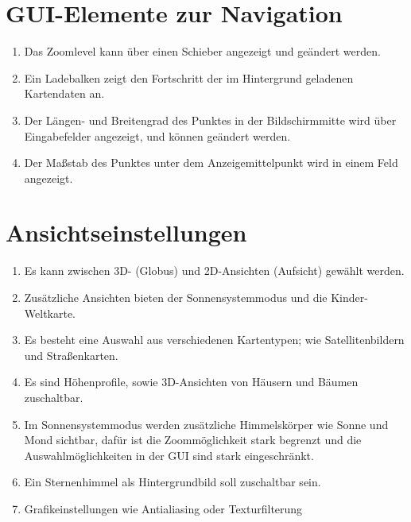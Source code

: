 \documentclass[10pt]{scrreprt}
\begin{document}
\section{GUI-Elemente zur Navigation}
\begin{enumerate}[leftmargin=2.5cm,resume]
\item Das Zoomlevel kann über einen Schieber angezeigt und geändert werden.
\item Ein Ladebalken zeigt den Fortschritt der im Hintergrund geladenen Kartendaten an.
\item Der Längen- und Breitengrad des Punktes in der Bildschirmmitte wird über Eingabefelder angezeigt, und können geändert werden.
\item Der Maßstab des Punktes unter dem Anzeigemittelpunkt wird in einem Feld angezeigt.
\end{enumerate}

\section{Ansichtseinstellungen}
\begin{enumerate}[leftmargin=2.5cm,resume]
\item Es kann zwischen 3D- (Globus) und 2D-Ansichten (Aufsicht) gewählt werden.
\wunsch
\item Zusätzliche Ansichten bieten der Sonnensystemmodus und die Kinder-Weltkarte.
\muss
\item Es besteht eine Auswahl aus verschiedenen Kartentypen; wie Satellitenbildern und Straßenkarten.
\wunsch
\item Es sind Höhenprofile, sowie 3D-Ansichten von Häusern und 
Bäumen zuschaltbar.
\item Im Sonnensystemmodus werden zusätzliche Himmelskörper wie Sonne und Mond sichtbar, dafür ist die Zoommöglichkeit stark begrenzt und die Auswahlmöglichkeiten in der GUI sind stark eingeschränkt.
\item Ein Sternenhimmel als Hintergrundbild soll zuschaltbar sein.
\item Grafikeinstellungen wie Antialiasing oder Texturfilterung
\end{enumerate}
\end{document}

